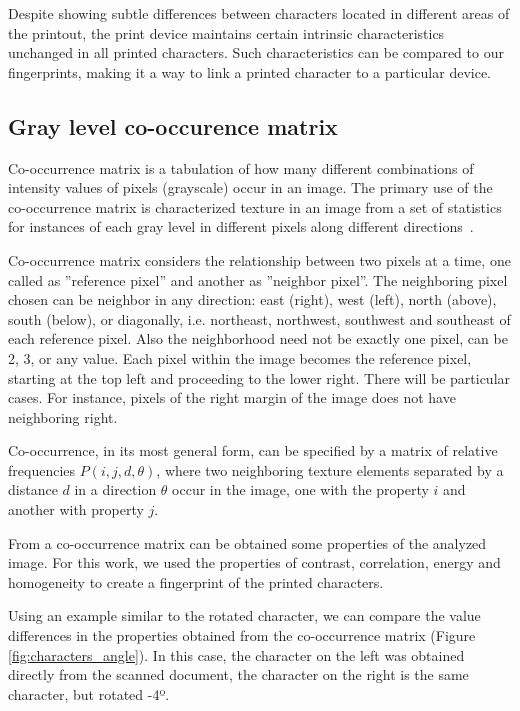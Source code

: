 \documentclass[10pt,twocolumn,letterpaper]{article}
\begin{document}
Despite showing subtle differences between characters located in different areas of the printout, the print device maintains certain intrinsic characteristics unchanged in all printed characters. Such characteristics can be compared to our fingerprints, making it a way to link a printed character to a particular device.

\subsection{Gray level co-occurence matrix}
\label{subsec:co-occurence_matrix}

Co-occurrence matrix is a tabulation of how many different combinations of intensity values of pixels (grayscale) occur in an image. The primary use of the co-occurrence matrix is characterized texture in an image from a set of statistics for instances of
each gray level in different pixels along different directions~\cite{Rocha}.

Co-occurrence matrix considers the relationship between two pixels at a time, one called as ''reference pixel'' and another as ''neighbor pixel''. The neighboring pixel chosen can be neighbor in any direction: east (right), west (left), north (above), south (below), or diagonally, i.e. northeast, northwest, southwest and southeast of each reference pixel. Also the neighborhood need not be exactly one pixel, can be 2, 3, or any value. Each pixel within the image becomes the reference pixel, starting at the top left and proceeding to the lower right. There will be particular cases. For instance, pixels of the right margin of the image does not have neighboring right.

Co-occurrence, in its most general form, can be specified by a matrix of relative frequencies $P (i, j, d,\theta)$, where two neighboring texture elements separated by a distance $d$ in a direction $\theta$ occur in the image, one with the property $i$ and another with property $j$.

From a co-occurrence matrix can be obtained some properties of the analyzed image. For this work, we used the properties of contrast, correlation, energy and homogeneity to create a fingerprint of the printed characters.

Using an example similar to the rotated character, we can compare the value differences in the properties obtained from the co-occurrence matrix (Figure \ref{fig:characters_angle}). In this case, the character on the left was obtained directly from the scanned document, the character on the right is the same character, but rotated -4º.
\end{document}
